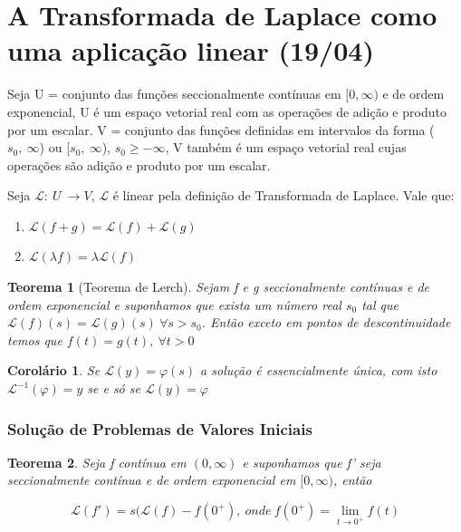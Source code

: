 \documentclass{article}
\newtheorem{theorem}{Teorema}[section]
\newtheorem{corollary}{Corolário}[theorem]
\begin{document}
\section*{A Transformada de Laplace como uma aplicação linear (19/04)}
\label{s11}
Seja U = {conjunto das funções seccionalmente contínuas em $[0, \infty )$ e de ordem exponencial}, U é um espaço vetorial real com as operações de adição e produto por um escalar. V = {conjunto das funções definidas em intervalos da forma ($s_0, \ \infty$) ou [$s_0, \ \infty$), $s_0 \geq - \infty$}, V também é um espaço vetorial real cujas operações são adição e produto por um escalar.

Seja $\mathscr{L}:\ U \ \xrightarrow{} V$, $\mathscr{L}$ é linear pela definição de Transformada de Laplace. Vale que:

\begin{enumerate}
    \item $\mathscr{L} (f + g) = \mathscr{L} (f) + \mathscr{L} (g)$
    
    \item $\mathscr{L} (\lambda f) = \lambda \mathscr{L}(f)$
\end{enumerate}

\begin{theorem}[Teorema de Lerch]
    Sejam f e g seccionalmente contínuas e de ordem exponencial e suponhamos que exista um número real $s_0$ tal que $\mathscr{L}(f)(s) = \mathscr{L}(g)(s) \ \forall s > s_0$. Então exceto em pontos de descontinuidade temos que $f(t) = g(t), \ \forall t > 0$
\end{theorem}

\begin{corollary}
    Se $\mathscr{L}(y) = \varphi(s)$ a solução é essencialmente única, com isto $\mathscr{L}^{-1} (\varphi) = y$ se e só se $\mathscr{L}(y) = \varphi$
\end{corollary}

\subsubsection*{Solução de Problemas de Valores Iniciais}
\begin{theorem}
    Seja f contínua em $(0, \infty)$ e suponhamos que f' seja seccionalmente contínua e de ordem exponencial em $[0, \infty)$, então
    
    $$\mathscr{L}(f') = s (\mathscr{L}(f) - f(0^+), \ onde \ f(0^+) = \lim_{t \xrightarrow{} 0^+} f(t)$$
\end{theorem}
\end{document}
